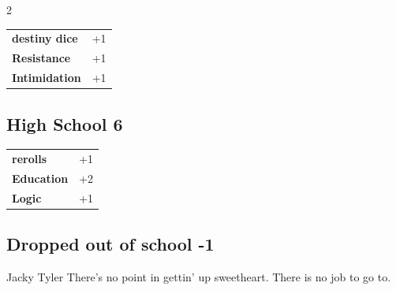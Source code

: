 \begin{multicols}{2}
\begin{tcolorbox}
\begin{tabular}{@{}ll@{}}
    \textbf{destiny dice} & +1\\
    \textbf{Resistance} & +1\\
    \textbf{Intimidation} & +1\\
\end{tabular}


\end{tcolorbox}

\begin{tcolorbox}
    \subsection*{High School \hfill \small{6 }}
    \tcblower




\begin{tabular}{@{}ll@{}}
    \textbf{rerolls} & +1\\
    \textbf{Education} & +2\\
    \textbf{Logic} & +1\\
\end{tabular}


\end{tcolorbox}

\begin{tcolorbox}
    \subsection*{Dropped out of school \hfill \small{-1 }}
    \tcblower


\begin{pquote}{Jacky Tyler}
There's no point in gettin' up sweetheart. There is no job to go to.
\end{pquote}

\vspace{3mm}


\end{tcolorbox}
\end{multicols}
